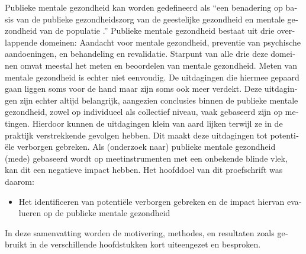 \begin{otherlanguage}{dutch}
Publieke mentale gezondheid kan worden gedefineerd als ``een benadering op basis van de publieke gezondheidszorg van de geestelijke gezondheid en mentale gezondheid van de populatie \parencite{Davies_2014}.'' Publieke mentale gezondheid bestaat uit drie overlappende domeinen: Aandacht voor mentale gezondheid, preventie van psychische aandoeningen, en behandeling en revalidatie. Starpunt van alle drie deze domeinen omvat meestal het meten en beoordelen van mentale gezondheid. Meten van mentale gezondheid is echter niet eenvoudig. De uitdagingen die hiermee gepaard gaan liggen soms voor de hand maar zijn soms ook meer verdekt. Deze uitdagingen zijn echter altijd belangrijk, aangezien conclusies binnen de publieke mentale gezondheid, zowel op individueel als collectief niveau, vaak gebaseerd zijn op metingen. Hierdoor kunnen de uitdagingen klein van aard lijken terwijl ze in de praktijk verstrekkende gevolgen hebben. Dit maakt deze uitdagingen tot potenti\"ele verborgen gebreken. Als (onderzoek naar) publieke mentale gezondheid (mede) gebaseerd wordt op meetinstrumenten met een onbekende blinde vlek, kan dit een negatieve impact hebben. Het hoofddoel van dit proefschrift was daarom:
\begin{itemize}
	\item Het identificeren van potenti\"ele verborgen gebreken en de impact hiervan evalueren op de publieke mentale gezondheid
\end{itemize} 
In deze samenvatting worden de motivering, methodes, en resultaten zoals gebruikt in de verschillende hoofdstukken kort uiteengezet en besproken.


\end{otherlanguage}
